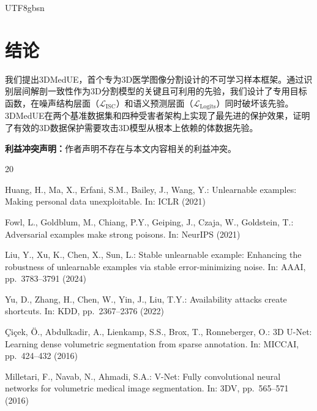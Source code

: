 \documentclass[a4paper,11pt]{article}
\begin{document}
\begin{CJK}{UTF8}{gbsn}
\section{结论}

我们提出3DMedUE，首个专为3D医学图像分割设计的不可学习样本框架。通过识别层间解剖一致性作为3D分割模型的关键且可利用的先验，我们设计了专用目标函数，在噪声结构层面（$\mathcal{L}_{\text{ISC}}$）和语义预测层面（$\mathcal{L}_{\text{Logits}}$）同时破坏该先验。3DMedUE在两个基准数据集和四种受害者架构上实现了最先进的保护效果，证明了有效的3D数据保护需要攻击3D模型从根本上依赖的体数据先验。

\vspace{1em}
\noindent\textbf{利益冲突声明：}作者声明不存在与本文内容相关的利益冲突。


\begin{thebibliography}{20}

Huang, H., Ma, X., Erfani, S.M., Bailey, J., Wang, Y.:
Unlearnable examples: Making personal data unexploitable.
In: ICLR (2021)

Fowl, L., Goldblum, M., Chiang, P.Y., Geiping, J., Czaja, W., Goldstein, T.:
Adversarial examples make strong poisons.
In: NeurIPS (2021)

Liu, Y., Xu, K., Chen, X., Sun, L.:
Stable unlearnable example: Enhancing the robustness of unlearnable examples via stable error-minimizing noise.
In: AAAI, pp.~3783--3791 (2024)

Yu, D., Zhang, H., Chen, W., Yin, J., Liu, T.Y.:
Availability attacks create shortcuts.
In: KDD, pp.~2367--2376 (2022)

\c{C}i\c{c}ek, \"O., Abdulkadir, A., Lienkamp, S.S., Brox, T., Ronneberger, O.:
3D U-Net: Learning dense volumetric segmentation from sparse annotation.
In: MICCAI, pp.~424--432 (2016)

Milletari, F., Navab, N., Ahmadi, S.A.:
V-Net: Fully convolutional neural networks for volumetric medical image segmentation.
In: 3DV, pp.~565--571 (2016)


\end{thebibliography}
\end{CJK}
\end{document}
